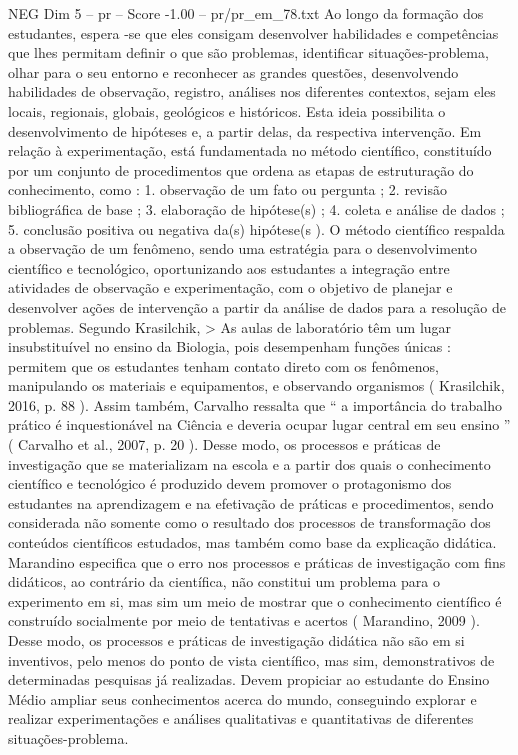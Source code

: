 \begin{textsample}{NEG Dim 5 – pr – Score -1.00 – pr/pr\_em\_78.txt}
Ao longo da formação dos estudantes, espera -se que eles consigam desenvolver habilidades e competências que lhes permitam definir o que são problemas, identificar situações-problema, olhar para o seu entorno e reconhecer as grandes questões, desenvolvendo habilidades de observação, registro, análises nos diferentes contextos, sejam eles locais, regionais, globais, geológicos e históricos.
Esta ideia possibilita o desenvolvimento de hipóteses e, a partir delas, da respectiva intervenção.
Em relação à experimentação, está fundamentada no método científico, constituído por um conjunto de procedimentos que ordena as etapas de estruturação do conhecimento, como : 1. observação de um fato ou pergunta ; 2. revisão bibliográfica de base ; 3. elaboração de hipótese(s) ; 4. coleta e análise de dados ; 5. conclusão positiva ou negativa da(s) hipótese(s ).
O método científico respalda a observação de um fenômeno, sendo uma estratégia para o desenvolvimento científico e tecnológico, oportunizando aos estudantes a integração entre atividades de observação e experimentação, com o objetivo de planejar e desenvolver ações de intervenção a partir da análise de dados para a resolução de problemas.
Segundo Krasilchik, > As aulas de laboratório têm um lugar insubstituível no ensino da Biologia, pois desempenham funções únicas : permitem que os estudantes tenham contato direto com os fenômenos, manipulando os materiais e equipamentos, e observando organismos ( Krasilchik, 2016, p. 88 ).
Assim também, Carvalho ressalta que “ a importância do trabalho prático é inquestionável na Ciência e deveria ocupar lugar central em seu ensino ” ( Carvalho et al., 2007, p. 20 ).
Desse modo, os processos e práticas de investigação que se materializam na escola e a partir dos quais o conhecimento científico e tecnológico é produzido devem promover o protagonismo dos estudantes na aprendizagem e na efetivação de práticas e procedimentos, sendo considerada não somente como o resultado dos processos de transformação dos conteúdos científicos estudados, mas também como base da explicação didática.
Marandino especifica que o erro nos processos e práticas de investigação com fins didáticos, ao contrário da científica, não constitui um problema para o experimento em si, mas sim um meio de mostrar que o conhecimento científico é construído socialmente por meio de tentativas e acertos ( Marandino, 2009 ).
Desse modo, os processos e práticas de investigação didática não são em si inventivos, pelo menos do ponto de vista científico, mas sim, demonstrativos de determinadas pesquisas já realizadas.
Devem propiciar ao estudante do Ensino Médio ampliar seus conhecimentos acerca do mundo, conseguindo explorar e realizar experimentações e análises qualitativas e quantitativas de diferentes situações-problema.

\end{textsample}
